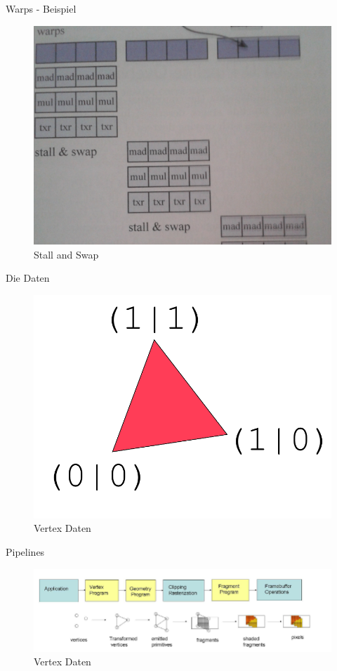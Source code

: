 \documentclass[11pt]{beamer}
\begin{document}
\begin{frame}{Warps - Beispiel}
    \begin{figure}[hbtp]
        \centering
        \includegraphics[scale=.14]{swap.png}
        \caption{Stall and Swap}
    \end{figure}
\end{frame}

\begin{frame}{Die Daten}
    \begin{figure}[hbtp]
        \centering
        \includegraphics[scale=.4]{data.png}
        \caption{Vertex Daten}
    \end{figure}
\end{frame}

\begin{frame}{Pipelines}
    \begin{figure}[hbtp]
        \centering
        \includegraphics[scale=.4]{pipeline.png}
        \caption{Vertex Daten}
    \end{figure}
\end{frame}
\end{document}
